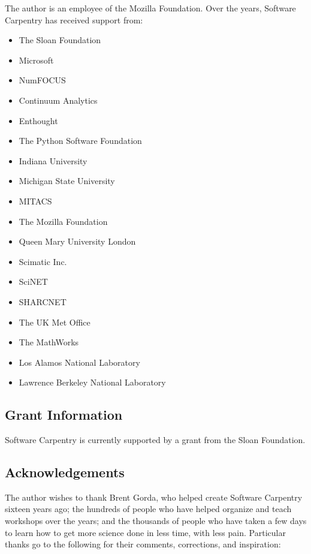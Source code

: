 \documentclass[10pt,a4paper,twocolumn]{article}
\begin{document}
The author is an employee of the Mozilla Foundation. Over the years,
Software Carpentry has received support from:

\begin{itemize}
\item
  The Sloan Foundation
\item
  Microsoft
\item
  NumFOCUS
\item
  Continuum Analytics
\item
  Enthought
\item
  The Python Software Foundation
\item
  Indiana University
\item
  Michigan State University
\item
  MITACS
\item
  The Mozilla Foundation
\item
  Queen Mary University London
\item
  Scimatic Inc.
\item
  SciNET
\item
  SHARCNET
\item
  The UK Met Office
\item
  The MathWorks
\item
  Los Alamos National Laboratory
\item
  Lawrence Berkeley National Laboratory
\end{itemize}

\subsection*{Grant Information}

Software Carpentry is currently supported by a grant from the Sloan
Foundation.

\subsection*{Acknowledgements}

The author wishes to thank Brent Gorda, who helped create Software
Carpentry sixteen years ago; the hundreds of people who have helped
organize and teach workshops over the years; and the thousands of
people who have taken a few days to learn how to get more science
done in less time, with less pain.  Particular thanks go to the
following for their comments, corrections, and inspiration:
\end{document}

